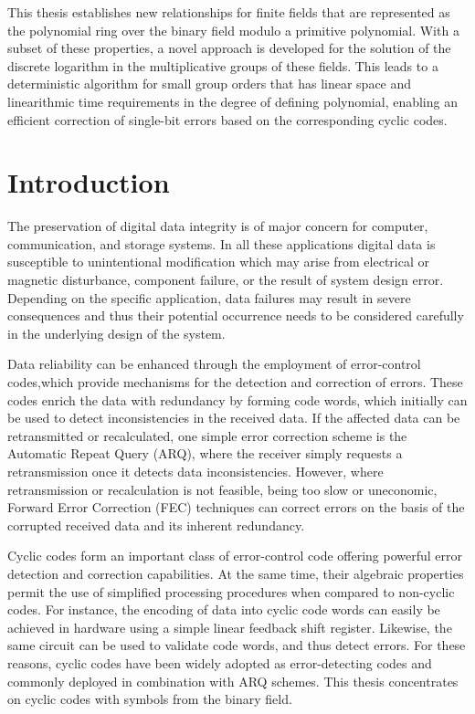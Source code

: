\documentclass[oneside, a4paper, 11pt]{memoir}
\begin{document}
This thesis establishes new relationships for finite fields that are represented as the polynomial ring over the binary field modulo a primitive polynomial. With a subset of these properties, a novel approach is developed for the solution of the discrete logarithm in the multiplicative groups of these fields. This leads to a deterministic algorithm for small group orders that has linear space and linearithmic time requirements in the degree of defining polynomial, enabling an efficient correction of single-bit errors based on the corresponding cyclic codes.

\section{Introduction}
The preservation of digital data integrity is of major concern for computer, communication, and storage systems. In all these applications digital data is susceptible to unintentional modification which may arise from electrical or magnetic disturbance, component failure, or the result of system design error. Depending on the specific application, data failures may result in severe consequences and thus their potential occurrence needs to be considered carefully in the underlying design of the system.

Data reliability can be enhanced through the employment of error-control codes,which provide mechanisms for the detection and correction of errors. These codes enrich the data with redundancy by forming code words, which initially can be used to detect inconsistencies in the received data. If the affected data can be retransmitted or recalculated, one simple error correction scheme is the Automatic Repeat Query (ARQ), where the receiver simply requests a retransmission once it detects data inconsistencies. However, where retransmission or recalculation is not feasible, being too slow or uneconomic, Forward Error Correction (FEC) techniques can correct errors on the basis of the corrupted received data and its inherent redundancy.

Cyclic codes form an important class of error-control code offering powerful error detection and correction capabilities. At the same time, their algebraic properties permit the use of simplified processing procedures when compared to non-cyclic codes. For instance, the encoding of data into cyclic code words can easily be achieved in hardware using a simple linear feedback shift register. Likewise, the same circuit can be used to validate code words, and thus detect errors. For these reasons, cyclic codes have been widely adopted as error-detecting codes and commonly deployed in combination with ARQ schemes. This thesis concentrates on cyclic codes with symbols from the binary field.
\end{document}
